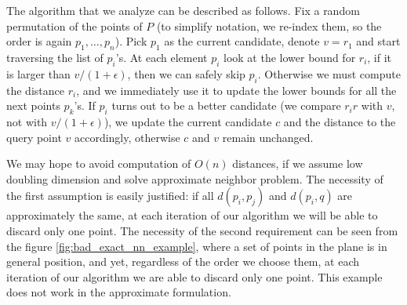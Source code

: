 \documentclass[a4paper,USenglish]{socg-lipics-v2018}
\newcommand{\eps}{\epsilon}
\newcommand{\dist}{\delta}
\begin{document}
The algorithm that we analyze can be described as follows. 
Fix a random permutation of the points of $P$ (to simplify notation,
we re-index them, so the order is again $p_1, \dots, p_n$). Pick $p_1$
as the current candidate, denote $v = r_1$ and start traversing the list of $p_i$'s.
At each element $p_i$ look at the lower bound for $r_i$,
if it is larger than $v / (1+\eps)$, then we can safely skip $p_i$.
Otherwise we must compute the distance $r_i$, and we immediately
 use it to update the lower bounds for all the next points $p_k$'s. 
If $p_i$ turns out to be a better candidate (we compare $r_ir$ with $v$, not with $v/(1+\eps)$),
we update the current candidate $c$ and the distance to the query point $v$ accordingly, 
otherwise $c$ and $v$ remain unchanged.


We may hope to avoid computation of $O(n)$ distances, if we assume low doubling dimension
and solve approximate neighbor problem. The necessity of the first assumption is easily justified: if all $d(p_i, p_j)$
and $d(p_i, q)$ are approximately the same, at each iteration of our algorithm we will be able to discard only one point.
The necessity of the second requirement can be seen from the figure \ref{fig:bad_exact_nn_example},
where a set of points in the plane is in general position, and yet, regardless of the order we choose them,
at each iteration of our algorithm we are able to discard only one point. This example does not work in the
approximate formulation.



\end{document}
